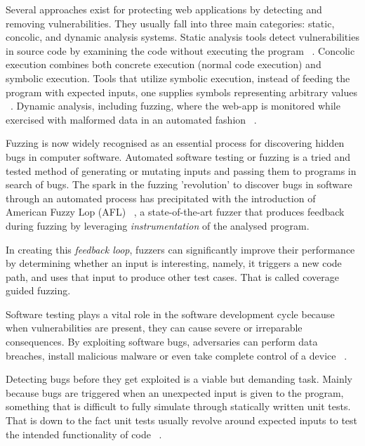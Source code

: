 Several approaches exist for protecting web applications by detecting and removing vulnerabilities. They usually fall into three main categories: static, concolic, and dynamic analysis systems. Static analysis tools detect vulnerabilities in source code by examining the code without executing the program ~\cite{balzarotti2008saner,jovanovic2006pixy,jovanovic2006precise,medeiros2014mining,medeiros2016dekant}.
Concolic execution combines both concrete execution (\ie normal code execution) and symbolic execution. Tools that utilize symbolic execution, instead of feeding the program with expected inputs, one supplies symbols representing arbitrary values ~\cite{king1976symoblic,Godefroid2008AutomatedWF}. Dynamic analysis, including fuzzing, where the web-app is monitored while exercised with malformed data in an automated fashion ~\cite{mller1990fuzz,godefroid2012sage,doupe2012enemy,duchene2014kameleonfuzz}.

Fuzzing is now widely recognised as an essential process for discovering hidden bugs in computer software. Automated software testing or fuzzing is a tried and tested method of generating or mutating inputs and passing them to programs in search of bugs. The spark in the fuzzing 'revolution' to discover bugs in software through an automated process has precipitated with the introduction of American Fuzzy Lop (AFL) ~\cite{zalewski2015american}, a state-of-the-art fuzzer that produces feedback during fuzzing by leveraging \emph{instrumentation} of the analysed program. 

In creating this \textit{feedback loop}, fuzzers can significantly improve their performance by determining whether an input is interesting, namely, it triggers a new code path, and uses that input to produce other test cases. That is called coverage guided fuzzing.

Software testing plays a vital role in the software development cycle because when vulnerabilities are present, they can cause severe or irreparable consequences. By exploiting software bugs, adversaries can perform data breaches, install malicious malware or even take complete control of a device ~\cite{hackerscontrol,facebook_data_breach}.

Detecting bugs before they get exploited is a viable but demanding task. Mainly because bugs are triggered when an unexpected input is given to the program, something that is difficult to fully simulate through statically written unit tests. That is down to the fact unit tests usually revolve around expected inputs to test the intended functionality of code ~\cite{aschermann2019nautilus}.

